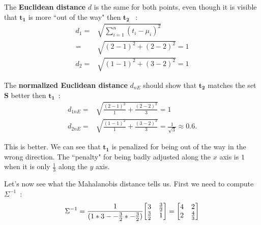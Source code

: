 \documentclass[11pt,twocolumn]{amsart} %
\newcommand{\ve}[1]{\boldsymbol{#1}}
\newcommand{\ma}[1]{\boldsymbol{#1}}
\newenvironment{m}{\begin{bmatrix}}{\end{bmatrix}}
\begin{document}
The \textbf{Euclidean distance} $d$ is the same for both points, even though it is visible that $\ve{t_1}$ is more ``out of the way" then $\ve{t_2}$ ~:
\begin{align*}
  d_1 = & \sqrt{\sum_{i=1}^{n}(t_i - \mu_i)^2} \\
     = & \sqrt{(2-1)^2 + (2-2)^2} = 1 \\
  d_2 = & \sqrt{(1-1)^2 + (3-2)^2} = 1
\end{align*}

The \textbf{normalized Euclidean distance} $d_{nE}$ should show that $\ve{t_2}$ matches the set $\ma{S}$ better then $\ve{t_1}$~:
\begin{align*}
  d_{1nE} = & \sqrt{\frac{(2-1)^2}{1} + \frac{(2-2)^2}{3}} = 1 \\
  d_{2nE} = & \sqrt{\frac{(1-1)^2}{1} + \frac{(3-2)^2}{3}} = \frac{1}{\sqrt{3}} \approx 0.6.
\end{align*}

This is better. We can see that $\ve{t_1}$ is penalized for being out of the way in the wrong direction. The ``penalty" for being badly adjusted along the $x$ axis is $1$ when it is only $\frac{1}{3}$ along the $y$ axis.

Let's now see what the Mahalanobis distance tells us. First we need to compute $\Sigma^{-1}$~:
\[
  \Sigma^{-1} = \frac{1}{(1*3 - -\frac{3}{2}*-\frac{3}{2})} \begin{m} 3 & \frac{3}{2} \\ \frac{3}{2} & 1\end{m} = \begin{m} 4 & 2 \\ 2 & \frac{4}{3} \end{m}
\]
\end{document}
